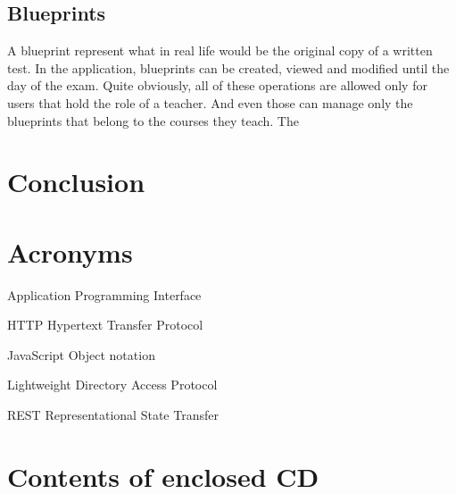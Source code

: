 \documentclass[thesis=M,english,hidelinks]{FITthesis}[2012/10/20]
\begin{document}
\section{Blueprints}

A blueprint represent what in real life would be the original copy of a written test. In the application, blueprints can be created, viewed and modified until the day of the exam. Quite obviously, all of these operations are allowed only for users that hold the role of a teacher. And even those can manage only the blueprints that belong to the courses they teach. The


\chapter{Conclusion}





\appendix

\chapter{Acronyms}

\begin{description}
   \item[API] Application Programming Interface
   \item{HTTP} Hypertext Transfer Protocol
   \item[JSON] JavaScript Object notation
   \item[LDAP] Lightweight Directory Access Protocol
   \item{REST} Representational State Transfer
\end{description}


\chapter{Contents of enclosed CD}

\begin{figure}
\end{figure}
\end{document}
